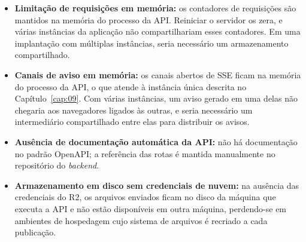 \begin{itemize}
    \item \textbf{Limitação de requisições em memória:} os contadores de requisições são mantidos na memória do processo da API. Reiniciar o servidor os zera, e várias instâncias da aplicação não compartilhariam esses contadores. Em uma implantação com múltiplas instâncias, seria necessário um armazenamento compartilhado.
    \item \textbf{Canais de aviso em memória:} os canais abertos de SSE ficam na memória do processo da API, o que atende à instância única descrita no
    Capítulo~\ref{cap:09}. Com várias instâncias, um aviso gerado em uma delas não chegaria aos navegadores ligados às outras, e seria necessário um
    intermediário compartilhado entre elas para distribuir os avisos.
    \item \textbf{Ausência de documentação automática da API:} não há documentação no padrão OpenAPI; a referência das rotas é mantida manualmente no repositório do \textit{backend}.
    \item \textbf{Armazenamento em disco sem credenciais de nuvem:} na ausência das credenciais do R2, os arquivos enviados ficam no disco da máquina que executa a API e não estão disponíveis em outra máquina, perdendo-se em ambientes de hospedagem cujo sistema de arquivos é recriado a cada publicação.
\end{itemize}
